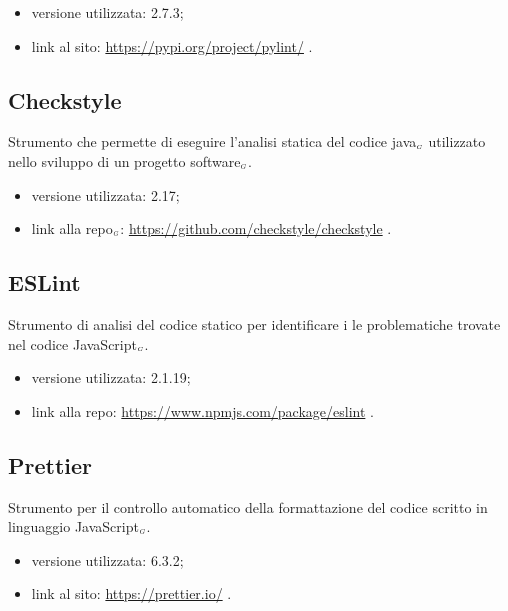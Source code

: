 \begin{itemize}
  \item versione utilizzata: 2.7.3;
  \item link al sito: \url{https://pypi.org/project/pylint/} .
\end{itemize}

\subsection{Checkstyle}\label{LibrerieCheckstyle}
Strumento che permette di eseguire l’analisi statica del codice java$_{\scaleto{G}{3pt}}$ utilizzato nello sviluppo di un progetto software$_{\scaleto{G}{3pt}}$.

\begin{itemize}
  \item versione utilizzata: 2.17;
  \item link alla repo$_{\scaleto{G}{3pt}}$: \url{https://github.com/checkstyle/checkstyle} .
\end{itemize}

\subsection{ESLint}\label{LibrerieESLint}
Strumento di analisi del codice statico per identificare i le problematiche trovate nel codice JavaScript$_{\scaleto{G}{3pt}}$.

\begin{itemize}
  \item versione utilizzata: 2.1.19;
  \item link alla repo: \url{https://www.npmjs.com/package/eslint} .
\end{itemize}

\subsection{Prettier}\label{LibreriePrettier}
Strumento per il controllo automatico della formattazione del codice scritto in linguaggio JavaScript$_{\scaleto{G}{3pt}}$.

\begin{itemize}
  \item versione utilizzata: 6.3.2;
  \item link al sito: \url{https://prettier.io/} .
\end{itemize}

